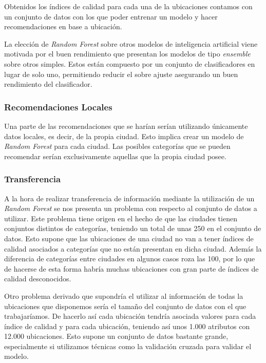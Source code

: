 Obtenidos los índices de calidad para cada una de la ubicaciones contamos con un conjunto de datos con los que poder entrenar un modelo y hacer recomendaciones en base a ubicación.

La elección de \textit{Random Forest} sobre otros modelos de inteligencia artificial viene motivada por el buen rendimiento que presentan los modelos de tipo \textit{ensemble} sobre otros simples. Estos están compuesto por un conjunto de clasificadores en lugar de solo uno, permitiendo reducir el sobre ajuste asegurando un buen rendimiento del clasificador.

\subsubsection{Recomendaciones Locales}

Una parte de las recomendaciones que se harían serían utilizando únicamente datos locales, es decir, de la propia ciudad. Esto implica crear un modelo de \textit{Random Forest} para cada ciudad. Las posibles categorías que se pueden recomendar serían exclusivamente aquellas que la propia ciudad posee.


\subsubsection{Transferencia}

A la hora de realizar transferencia de información mediante la utilización de un \textit{Random Forest} se nos presenta un problema con respecto al conjunto de datos a utilizar. Este problema tiene origen en el hecho de que las ciudades tienen conjuntos distintos de categorías, teniendo un total de unas 250 en el conjunto de datos. Esto supone que las ubicaciones de una ciudad no van a tener índices de calidad asociados a categorías que no están presentan en dicha ciudad. Además la diferencia de categorías entre ciudades en algunos casos roza las 100, por lo que de hacerse de esta forma habría muchas ubicaciones con gran parte de índices de calidad desconocidos.

Otro problema derivado que supondría el utilizar al información de todas la ubicaciones que disponemos sería el tamaño del conjunto de datos con el que trabajaríamos. De hacerlo así cada ubicación tendría asociada valores para cada índice de calidad y para cada ubicación, teniendo así unos 1.000 atributos con 12.000 ubicaciones. Esto supone un conjunto de datos bastante grande, especialmente si utilizamos técnicas como la validación cruzada para validar el modelo.